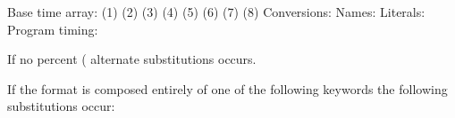 \begin{DoxyVerb}
 Base time array:
 (1) %
 (2) %
 (3) %
 (4) %
 (5) %
 (6) %
 (7) %
 (8) %
 Conversions:
  Names:
  Literals:
  Program timing:

If no percent (%
alternate substitutions occurs.

If the format is composed entirely of one of the following
keywords the following substitutions occur:


\end{DoxyVerb}
